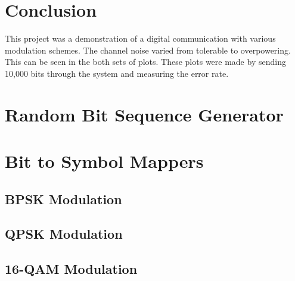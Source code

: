 \documentclass[]{article}
\begin{document}
\section{Conclusion}
\label{sec:conc}
This project was a demonstration of a digital communication with various modulation schemes.  The channel noise varied from tolerable to overpowering.  This can be seen in the both sets of plots.  These plots were made by sending 10,000 bits through the system and measuring the error rate.

\appendix
\newpage
%


\section{Random Bit Sequence Generator}
\label{app:random_bit_generator}

\cleardoublepage
\newpage

\section{Bit to Symbol Mappers}
\label{app:bittosym}
\subsection{BPSK Modulation }
\label{app:bpsk_mod}
%


\cleardoublepage  %
\newpage

\subsection{QPSK Modulation}
\label{app:qpsk_mod}

\cleardoublepage  %
\newpage

\subsection{16-QAM Modulation}
\label{app:qam_16_mod}
\end{document}
